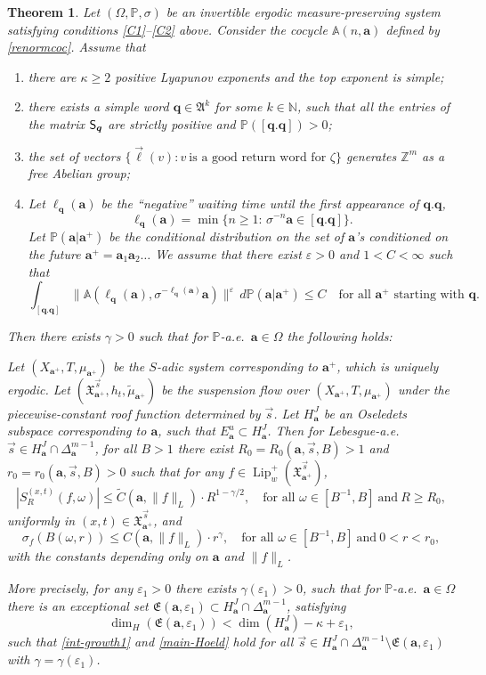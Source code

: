 \documentclass[10pt]{amsart}
\newenvironment{enumeratea}
{\bgroup\def\theenumi{\alph{enumi}}\begin{enumerate}}
{\end{enumerate}\egroup}
\newcommand{\sep}{:}
\let\epsilon\varepsilon
\theoremstyle{plain}
\newtheorem{theorem}{Theorem}[section]
\theoremstyle{definition}
\let\wt\widetilde
\DeclareMathOperator{\Lip}{Lip}
\newcommand\bom{{\boldsymbol a}}\let\ba\bom
\newcommand \q {{\boldsymbol q}}
\newcommand\bq{{\boldsymbol q}}
\newcommand\bqcyl{[\bq.\bq]}
\let\eps\varepsilon
\let\gam\gamma
\let\om\omega
\let\Om\Omega
\let\sig\sigma
\newcommand\FrA{\mathfrak{A}}
\newcommand\Fre{\mathfrak{E}}
\newcommand\Xx{\mathfrak{X}}
\newcommand\Aa{\mathbb{A}}
\newcommand{\Z}{\mathbb{Z}}
\newcommand{\N}{\mathbb{N}}
\renewcommand{\P}{\mathbb{P}}
\newcommand\Sf{{\sf S}}
\newcommand\be{\begin{equation}}
\newcommand\ee{\end{equation}}
\begin{document}
\begin{theorem} \label{th-main1}
Let $(\Om,\P,\sig)$ be an invertible ergodic measure-preserving system satisfying conditions \eqref{C1}--\eqref{C2} above. Consider the cocycle $\Aa(n,\bom)$ defined by \eqref{renormcoc}. Assume that
\begin{enumeratea}
\item\label{th-main1a}
there are $\kappa\ge 2$ positive Lyapunov exponents
and the top exponent is simple;
\item\label{th-main1b} there exists a simple word $\bq\in \FrA^k$ for some $k\in \N$, such that all the entries of the matrix $\Sf_\bq$ are strictly positive and $\P(\bqcyl)>0$;
\item\label{th-main1c}
the set of vectors $\{\vec\ell(v)\sep v\ \text{is a good
return word for $\zeta$}\}$ generates $\Z^m$ as a free Abelian group;
\item\label{th-main1d}
Let $\ell_\bq(\bom)$ be the ``negative'' waiting time until the first appearance of $\bq.\bq$, \ie
\[
\ell_\bq(\bom) = \min\{n\ge 1:\, \sig^{-n}\bom \in \bqcyl\}.
\]
Let $\P(\bom|\bom^+)$ be the conditional distribution on the set of $\bom$'s
conditioned on the future $\bom^+ = \bom_1\bom_2\ldots$ We assume that there exist $\eps>0$ and $1<C<\infty$ such that
\be \label{eq-star1}
\int_{\bqcyl} \bigl\|\Aa(\ell_\bq(\bom), \sig^{-\ell_\bq(\bom)}\bom)\bigr\|^\eps\,d\P(\bom|\bom^+) \le C\quad \text{for all $\bom^+$ starting with $\q$}.
\ee
\end{enumeratea}
\noindent
Then there exists $\gam>0$ such that for $\P$-a.e.\ $\bom \in \Om$ the following holds:

Let $(X_{\bom^+},T,\mu_{\bom^+})$ be
the $S$-adic system corresponding to $\bom^+$, which is uniquely ergodic.
Let $(\Xx_{\bom^+}^{\vec{s}},h_t,\wt \mu_{\bom^+})$ be the suspension flow over $(X_{\bom^+},T,\mu_{\bom^+})$ under the piecewise-constant roof function determined by $\vec{s}$.
Let $H^J_\bom$ be an Oseledets subspace corresponding to $\bom$, such that $E^u_\bom\subset H^J_\bom$. Then
for Lebesgue-a.e.\ $\vec{s}\in H^J_\bom\cap \Delta_\bom^{m-1}$,
for all
$B>1$ there exist $R_0 = R_0(\bom,\vec s, B)>1$ and $r_0=r_0(\bom, \vec s, B)>0$
such that for any $f\in \Lip_w^+(\Xx_{\bom^+}^{\vec{s}})$,
\be \label{int-growth1}
|S^{(x,t)}_R(f,\om)| \le \wt{C}(\bom,\|f\|_L)\cdot R^{1-\gam/2},\quad \text{for all }\om\in[B^{-1},B]\ \text{and}\ R\ge R_0,
\ee
uniformly in $(x,t)\in \Xx_{\bom^+}^{\vec{s}}$, and
\be \label{main-Hoeld}
\sig_f(B(\om,r))\le C(\bom,\|f\|_L)\cdot r^\gam,\quad \text{for all } \om\in[B^{-1},B]\ \text{and}\ 0<r< r_0,
\ee
with the constants depending only on $\bom$ and $\|f\|_L$.

More precisely, for any $\epsilon_1>0$ there exists $\gam(\epsilon_1)>0$, such that for $\P$-a.e.\ $\bom \in \Om$ there is an exceptional set $\Fre(\bom,\epsilon_1)\subset H_\bom^J\cap \Delta_\bom^{m-1}$, satisfying
\be \label{dimesta}
\dim_H(\Fre(\bom,\epsilon_1)) < \dim(H^J_\bom)-\kappa+ \epsilon_1,
\ee
such that \eqref{int-growth1} and \eqref{main-Hoeld} hold for all $\vec s\in H^J_\bom \cap \Delta_\bom^{m-1}\setminus \Fre(\bom,\eps_1)$ with $\gam = \gam(\epsilon_1)$.
\end{theorem}
\end{document}
